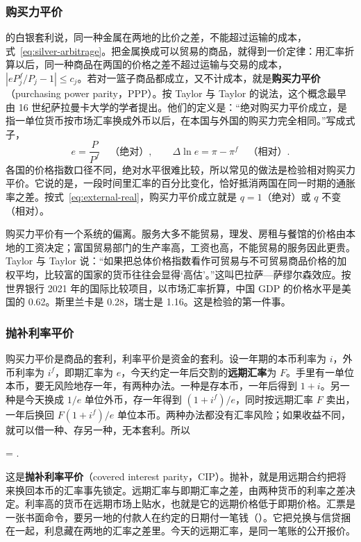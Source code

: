 \subsubsection{购买力平价}
的白银套利说，同一种金属在两地的比价之差，不能超过运输的成本，式~\eqref{eq:silver-arbitrage}。把金属换成可以贸易的商品，就得到一价定律：用汇率折算以后，同一种商品在两国的价格之差不超过运输与交易的成本，$|eP^{f}_j/P_j-1|\le c_j$。若对一篮子商品都成立，又不计成本，就是\textbf{购买力平价}（purchasing power parity，PPP）。按 Taylor 与 Taylor 的说法，这个概念最早由 16 世纪萨拉曼卡大学的学者提出\cite{taylor2004}。他们的定义是：“绝对购买力平价成立，是指一单位货币按市场汇率换成外币以后，在本国与外国的购买力完全相同。”\cite{taylor2004}写成式子，
\begin{equation}
e=\frac{P}{P^{f}}\quad\text{（绝对）},\qquad \Delta\ln e=\pi-\pi^{f}\quad\text{（相对）}.\label{eq:external-ppp}
\end{equation}
各国的价格指数口径不同，绝对水平很难比较，所以常见的做法是检验相对购买力平价。它说的是，一段时间里汇率的百分比变化，恰好抵消两国在同一时期的通胀率之差\cite{taylor2004}。按式~\eqref{eq:external-real}，购买力平价成立就是 $q=1$（绝对）或 $q$ 不变（相对）。

购买力平价有一个系统的偏离。服务大多不能贸易，理发、房租与餐馆的价格由本地的工资决定；富国贸易部门的生产率高，工资也高，不能贸易的服务因此更贵。Taylor 与 Taylor 说：“如果把总体价格指数看作可贸易与不可贸易商品价格的加权平均，比较富的国家的货币往往会显得‘高估’。”\cite{taylor2004}这叫巴拉萨—萨缪尔森效应。按世界银行 2021 年的国际比较项目，以市场汇率折算，中国 GDP 的价格水平是美国的 0.62。斯里兰卡是 0.28，瑞士是 1.16\cite{wdi2026}。这是检验的第一件事。

\subsubsection{抛补利率平价}
购买力平价是商品的套利，利率平价是资金的套利。设一年期的本币利率为 $i$，外币利率为 $i^{f}$，即期汇率为 $e$，今天约定一年后交割的\textbf{远期汇率}为 $F$。手里有一单位本币，要无风险地存一年，有两种办法。一种是存本币，一年后得到 $1+i$。另一种是今天换成 $1/e$ 单位外币，存一年得到 $(1+i^{f})/e$，同时按远期汇率 $F$ 卖出，一年后换回 $F(1+i^{f})/e$ 单位本币。两种办法都没有汇率风险；如果收益不同，就可以借一种、存另一种，无本套利。所以
\begin{keyeq}
= .\label{eq:external-cip}
\end{keyeq}
这是\textbf{抛补利率平价}（covered interest parity，CIP）。抛补，就是用远期合约把将来换回本币的汇率事先锁定。远期汇率与即期汇率之差，由两种货币的利率之差决定。利率高的货币在远期市场上贴水，也就是它的远期价格低于即期价格。汇票是一张书面命令，要另一地的付款人在约定的日期付一笔钱（）。它把兑换与信贷捆在一起，利息藏在两地的汇率之差里。今天的远期汇率，是同一笔账的公开报价。

